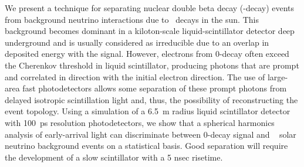 We present a technique for separating nuclear double beta decay
(\bb-decay) events from background neutrino interactions due to
\B~decays in the sun.  This background becomes dominant in a
kiloton-scale liquid-scintillator detector deep underground and is
usually considered as irreducible due to an overlap in deposited
energy with the signal.  However, electrons from 0\nbb-decay often
exceed the Cherenkov threshold in liquid scintillator, producing
photons that are prompt and correlated in direction with the
initial electron direction. The use of large-area fast photodetectors
allows some separation of these prompt photons from delayed isotropic
scintillation light and, thus, the possibility of reconstructing the
event topology.  Using a simulation of a 6.5~m radius liquid
scintillator detector with 100~ps resolution photodetectors, we show
that a spherical harmonics analysis of early-arrival light can
discriminate between 0\nbb-decay signal and
\B~ solar neutrino background events on a statistical basis. 
Good separation will require the development of a slow scintillator 
with a 5 nsec risetime.



